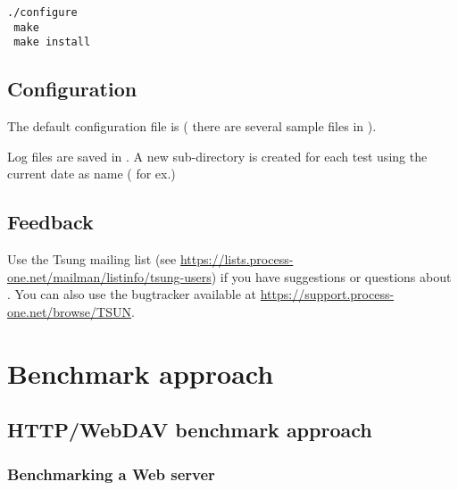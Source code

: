 \documentclass{IDXDOC-en}
\begin{document}
\begin{Verbatim}
./configure
 make
 make install
\end{Verbatim}
\subsection{Configuration}

The default configuration file is  (
there are several sample files in
).

Log files are saved in  . A new sub-directory
is created for each test using the current date as name
( for ex.)

\subsection{Feedback}

Use the Tsung mailing list (see
\url{https://lists.process-one.net/mailman/listinfo/tsung-users}) if you have
suggestions or questions about . You can also use the
bugtracker available at \url{https://support.process-one.net/browse/TSUN}.

\section{Benchmark approach}

\subsection{HTTP/WebDAV benchmark approach}

\subsubsection{Benchmarking a Web server}
\end{document}
